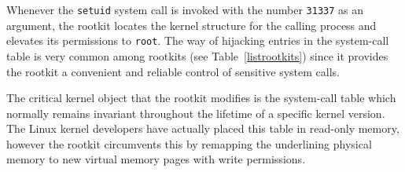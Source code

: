\setlength{\textfloatsep}{0.5mm}
\begin{table}%
\begin{center}

\end{center}
\vspace{-0.3cm}
\caption{Testing machine specification}
\vspace{0.3cm}
\label{machinespecs}
\end{table}



Whenever the \texttt{setuid} system call is invoked with the number \texttt{31337} as an argument, the rootkit locates the kernel structure for the calling process and elevates its permissions to \texttt{root}. The way of hijacking entries in the system-call table is very common among rootkits (see Table~\ref{listrootkits}) since it provides the rootkit a convenient and reliable control of sensitive system calls.

The critical kernel object that the rootkit modifies is the system-call table which normally remains invariant throughout the lifetime of a specific kernel version. The Linux kernel developers have actually placed this table in read-only memory, however the rootkit circumvents this by remapping the underlining physical memory to new virtual memory pages with write permissions.

